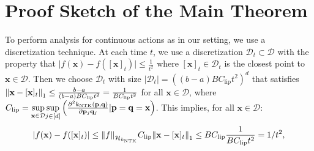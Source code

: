  \section{Proof Sketch of the Main Theorem}
To perform analysis for continuous actions as in our setting, we use a discretization technique. At each time $t$, we use a discretization $\mathcal{D}_t \subset \mathcal{D}$ with the property that $\lvert f(\mathbf{x}) - f([\mathbf{x}]_t) \rvert \leq \frac{1}{t^2}$ where $[\mathbf{x}]_t \in \mathcal{D}_t$ is the closest point to $\mathbf{x} \in \mathcal{D}$. Then we choose $\mathcal{D}_t $ 
with size $\lvert \mathcal{D}_t \rvert = \left( (b-a)BC_{\text{lip}}t^2 \right)^d$ that satisfies $\norm{\mathbf{x} - [\mathbf{x}]_t}_1 \leq \frac{b-a}{(b-a)BC_{\text{lip}}t^2} = \frac{1}{BC_{\text{lip}}t^2}$ for all $\mathbf{x} \in \mathcal{D}$,
where $C_{\text{lip}}= \underset{\mathbf{x} \in \mathcal{D}} {\operatorname*{sup}} \underset{j \in [d]} {\operatorname*{sup}} \left( \frac{\partial^2 k_\text{NTK}(\mathbf{p},\mathbf{q})}{\partial \mathbf{p}_j \mathbf{q}_j} \lvert \mathbf{p}=\mathbf{q}=\mathbf{x} \right)$. This implies, for all $\mathbf{x} \in \mathcal{D}$:
\begin{equation}
\label{eqn:neural-bo_rkhs_lipschitz}
    \lvert f(\mathbf{x}) - f([\mathbf{x}]_t) \rvert \leq \norm{f}_{\mathcal{H}_{k_\textup{NTK}}} C_{\text{lip}} \norm{\mathbf{x} - [\mathbf{x}]_t}_1 \leq BC_{\text{lip}} \frac{1}{BC_{\text{lip}}t^2} =  1/t^2, 
\end{equation}
